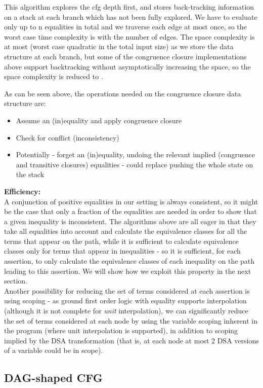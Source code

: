 This algorithm explores the cfg depth first, and stores back-tracking information on a stack at each branch which has not been fully explored.
We have to evaluate only up to n equalities in total and we traverse each edge at most once, so the worst case time complexity is  with  the number of edges. 
The space complexity is at most  (worst case quadratic in the total input size) as we store the data structure at each branch, but some of the congruence closure implementations above support backtracking without asymptotically increasing the space, so the space complexity is reduced to .

As can be seen above, the operations needed on the congruence closure data structure are:
\begin{itemize}
	\item Assume an (in)equality and apply congruence closure
	\item Check for conflict (inconsistency)
	\item Potentially - forget an (in)equality, undoing the relevant implied (congruence and transitive closures) equalities - could replace pushing the whole state on the stack
\end{itemize}

\noindent
\textbf{Efficiency:}\\
A conjunction of positive equalities in our setting is always consistent, so it might be the case that only a fraction of the equalities are needed in order to show that a given inequality is inconsistent. The algorithms above are all eager in that they take all equalities into account and calculate the equivalence classes for all the terms that appear on the path, while it is sufficient to calculate equivalence classes only for terms that appear in inequalities - so it is sufficient, for each assertion,
to only calculate the equivalence classes of each inequality on the path leading to this assertion.
We will show how we exploit this property in the next section.\\
Another possibility for reducing the set of terms considered at each assertion is using scoping - as ground first order logic with equality supports interpolation (although it is not complete for \emph{unit} interpolation), we can significantly reduce the set of terms considered at each node by using the variable scoping inherent in the program (where unit interpolation is supported), in addition to scoping implied by the DSA transformation (that is, at each node at most 2 DSA versions of a variable could be in scope).

\subsection{DAG-shaped CFG}

